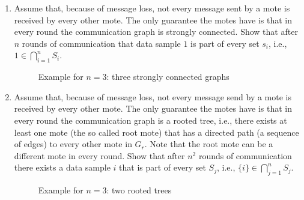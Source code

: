 \begin{enumerate} 
	\item {}
		Assume that, because of message loss, not every message sent by a mote
		is received by every other mote. 
		The only guarantee the motes have is that in every round the
		communication graph is strongly connected.
		Show that after $n$ rounds of communication that data sample $1$ is part of every set $s_i$, i.e., $1 \in \bigcap_{i=1}^n S_i $.
\begin{figure}[h!]
\centering
	\caption{Example for $n=3$: three strongly connected graphs}
\end{figure}
	\item {} Assume that,
		because of message loss, not every message send by a mote is received
		by every other mote. The only guarantee the motes have is that in every round
		the communication graph is a rooted tree, i.e., there exists at least one mote (the so called root mote) that has a directed path (a sequence of edges) to every other mote in $G_r$. Note that 		the root mote can be a different mote in every round.
		Show that after $n^2$ rounds of communication there exists a data sample $i$ that is part of every set $S_j$, i.e., $\{i\} \in \bigcap_{j=1}^n S_j $.
\begin{figure}[h!]
\centering
	\caption{Example for $n=3$: two rooted trees}
\end{figure}
\end{enumerate}

